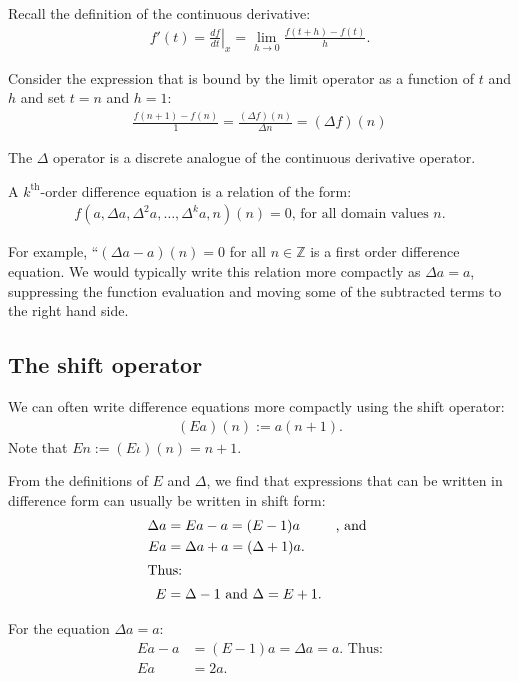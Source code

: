 \documentclass[12pt,letterpaper,reqno]{amsart}
\numberwithin{equation}{section}
\numberwithin{theorem}{section}
\numberwithin{table}{section}
\begin{document}
Recall the definition of the continuous derivative:
\begin{align*}
	f'(t) = \left.\frac{df}{dt}\right|_x = \lim_{h\rightarrow 0}\frac{f(t+h) - f(t)}{h}
	\text{.}
\end{align*}

Consider the expression that is bound by the limit operator as a function of $t$ and $h$ and set $t=n$ and $h=1$:
\begin{align*}
	\frac{f(n+1)-f(n)}{1} = \frac{(\Delta f)(n)}{\Delta n} = (\Delta f)(n)
\end{align*}

The $\Delta$ operator is a discrete analogue of the continuous derivative operator.

A $k^{\text{th}}$-order difference equation is a relation of the form:
\begin{align}
	f(a, \Delta a, \Delta^2 a, \dots, \Delta^k a, n)(n) = 0
	\text{, for all domain values $n$.}
\end{align}

For example, ``$(\Delta a-a)(n)=0$ for all $n\in\mathbb{Z}$ is a first order difference equation.  We would typically write this relation more compactly as $\Delta a=a$, suppressing the function evaluation and moving some of the subtracted terms to the right hand side.

\subsection{The shift operator}

We can often write difference equations more compactly using the shift operator:
\begin{align}
	(Ea)(n) := a(n+1)
	\text{.}
\end{align}
Note that $En:=(E\iota)(n)=n+1$.

From the definitions of $E$ and $\Delta$, we find that expressions that can be written in difference form can usually be written in shift form:
\begin{align}
		\notag
	\Delta a &= Ea - a = (E-1)a
	&\text{, and } \\
		\notag
	Ea &= \Delta a + a = (\Delta+1)a
	\text{.} \\
\intertext{Thus:}
	E &= \Delta - 1 \text{ and } \Delta = E + 1 \text{.}
\end{align}

For the equation $\Delta a=a$:
\begin{align*}
	Ea-a &= (E-1)a = \Delta a = a
	\text{. Thus:} \\
	Ea &= 2a
	\text{.}
\end{align*}
\end{document}

